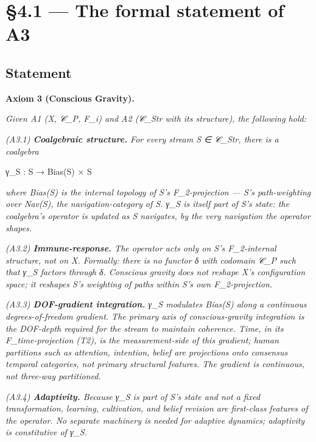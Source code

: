 \documentclass[11pt, openany]{book}
\newcommand{\sectionbreak}{\clearpage}
\begin{document}
\sectionbreak

\section{§4.1 --- The formal statement of A3}

\subsection{Statement}

\textbf{Axiom 3 (Conscious Gravity).}

\textit{Given A1 (X, 𝒞\_\allowbreak{}P, F\_\allowbreak{}i) and A2 (𝒞\_\allowbreak{}Str with its structure), the following hold:}

\textit{(A3.1) \textbf{Coalgebraic structure.} For every stream S ∈ 𝒞\_\allowbreak{}Str, there is a coalgebra}
\begin{Code}
γ_S : S → Bias(S) × S
\end{Code}
\textit{where Bias(S) is the internal topology of S's F\_\allowbreak{}2-projection --- S's path-weighting over Nav(S), the navigation-category of S. γ\_\allowbreak{}S is itself part of S's state: the coalgebra's operator is updated as S navigates, by the very navigation the operator shapes.}

\textit{(A3.2) \textbf{Immune-response.} The operator acts only on S's F\_\allowbreak{}2-internal structure, not on X. Formally: there is no functor δ with codomain 𝒞\_\allowbreak{}P such that γ\_\allowbreak{}S factors through δ. Conscious gravity does not reshape X's configuration space; it reshapes S's weighting of paths within S's own F\_\allowbreak{}2-projection.}

\textit{(A3.3) \textbf{DOF-gradient integration.} γ\_\allowbreak{}S modulates Bias(S) along a continuous degrees-of-freedom gradient. The primary axis of conscious-gravity integration is the DOF-depth required for the stream to maintain coherence. Time, in its F\_\allowbreak{}time-projection (T2), is the measurement-side of this gradient; human partitions such as attention, intention, belief are projections onto consensus temporal categories, not primary structural features. The gradient is continuous, not three-way partitioned.}

\textit{(A3.4) \textbf{Adaptivity.} Because γ\_\allowbreak{}S is part of S's state and not a fixed transformation, learning, cultivation, and belief revision are first-class features of the operator. No separate machinery is needed for adaptive dynamics; adaptivity is constitutive of γ\_\allowbreak{}S.}
\end{document}
